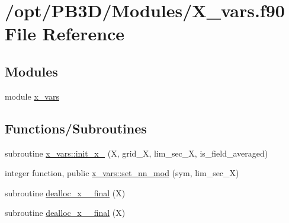 \hypertarget{X__vars_8f90}{}\section{/opt/\+P\+B3\+D/\+Modules/\+X\+\_\+vars.f90 File Reference}
\label{X__vars_8f90}
\subsection*{Modules}
\begin{DoxyCompactItemize}
\item 
module \hyperlink{namespacex__vars}{x\+\_\+vars}
\end{DoxyCompactItemize}
\subsection*{Functions/\+Subroutines}
\begin{DoxyCompactItemize}
\item 
subroutine \hyperlink{namespacex__vars_a0cf9a4b9bd7874815cf0cbf9bf858918}{x\+\_\+vars\+::init\+\_\+x\+\_} (X, grid\+\_\+X, lim\+\_\+sec\+\_\+X, is\+\_\+field\+\_\+averaged)
\item 
integer function, public \hyperlink{namespacex__vars_a90d744aee4358a8cc35d29304d1bb120}{x\+\_\+vars\+::set\+\_\+nn\+\_\+mod} (sym, lim\+\_\+sec\+\_\+X)
\item 
subroutine \hyperlink{X__vars_8f90_a0dacd775e322b824c05e804ad5291aa4}{dealloc\+\_\+x\+\_\+\_\+final} (X)
\item 
subroutine \hyperlink{X__vars_8f90_ad33ba3e63c71fe167351af3317dc22ec}{dealloc\+\_\+x\+\_\+\_\+final} (X)
\end{DoxyCompactItemize}
